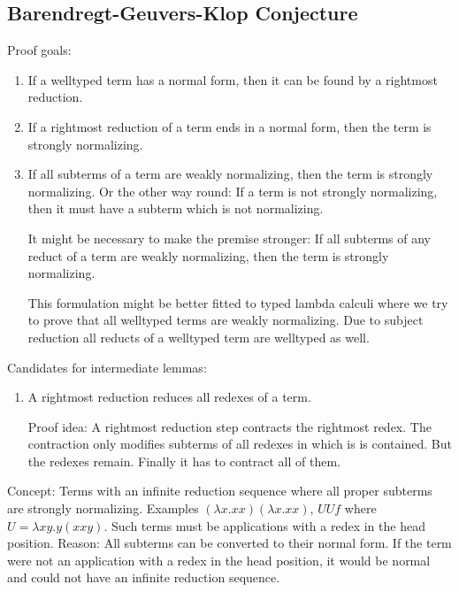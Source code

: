\subsection{Barendregt-Geuvers-Klop Conjecture}

Proof goals:
\begin{enumerate}
    \item If a welltyped term has a normal form, then it can be found
        by a rightmost reduction.

    \item If a rightmost reduction of a term ends in a normal form, then
        the term is strongly normalizing.

    \item  If all subterms of a term are weakly normalizing, then the term
        is strongly normalizing. Or the other way round: If a term is not
        strongly normalizing, then it must have a subterm which is not
        normalizing.

        It might be necessary to make the premise stronger: If all subterms of
        any reduct of a term are weakly normalizing, then the term is strongly
        normalizing.

        This formulation might be better fitted to typed lambda calculi
        where we try to prove that all welltyped terms are weakly normalizing.
        Due to subject reduction all reducts of a welltyped term are welltyped
        as well.
\end{enumerate}

Candidates for intermediate lemmas:
\begin{enumerate}
    \item A rightmost reduction reduces all redexes of a term.

        Proof idea: A rightmost reduction step contracts the rightmost redex.
        The contraction only modifies subterms of all redexes
        in which is is contained. But the redexes remain. Finally it has to
        contract all of them.
\end{enumerate}


Concept: Terms with an infinite reduction sequence where all proper subterms are
strongly normalizing. Examples $(\lambda x. x x)(\lambda x. x x)$, $U U f$ where
$U = \lambda x y. y (x x y)$. Such terms must be applications with a redex in
the head position. Reason: All subterms can be converted to their normal form.
If the term were not an application with  a redex in the head position, it would
be normal and could not have an infinite reduction sequence.

